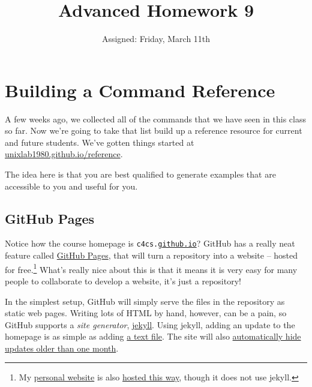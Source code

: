 \documentclass{article}
\begin{document}
\fancyfoot[C]{\color{gray} \thepage~/~\pageref*{LastPage}}
\pagestyle{fancyplain}


\title{\textbf{Advanced Homework 9\\}}
\author{Assigned: Friday, March 11th}
\date{\textbf{\color{red}{Due: Before the first lecture on Friday, March 25}}}
\maketitle



\section*{Building a Command Reference}

A few weeks ago, we collected all of the commands that we have seen in this
class so far. Now we're going to take that list build up a reference resource
for current and future students. We've gotten things started at
\href{https://unixlab1980.github.io/reference}{unixlab1980.github.io/reference}.

The idea here is that you are best qualified to generate examples that are
accessible to you and useful for you.

\subsection*{GitHub Pages}

Notice how the course homepage is \texttt{c4cs.\ul{github.io}}? GitHub has a
really neat feature called \href{https://pages.github.com/}{GitHub Pages},
that will turn a repository into a website -- hosted for free.\footnote{
  My \href{https://github.com/ppannuto/patpannuto.com}{personal website} is also
  \href{https://github.com/ppannuto/ppannuto.github.io}{hosted this way},
  though it does not use jekyll.
} What's really nice about this is that it means it is very easy for many
people to collaborate to develop a website, it's just a repository!

In the simplest setup, GitHub will simply serve the files in the repository as
static web pages. Writing lots of HTML by hand, however, can be a pain, so
GitHub supports a \emph{site generator}, \href{https://jekyllrb.com/}{jekyll}.
Using jekyll, adding an update to the homepage is as simple as adding
\href{https://github.com/unixlab1980/unixlab1980.github.io/blob/master/updates/_posts/2016-02-27-spring-break-advanced.md}{a text file}.
The site will also
\href{https://github.com/unixlab1980/unixlab1980.github.io/blob/master/index.html#L32}%
{automatically hide updates older than one month}.
\end{document}
